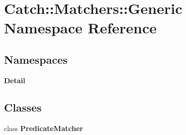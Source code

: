 \section{Catch\+::Matchers\+::Generic Namespace Reference}
\label{namespace_catch_1_1_matchers_1_1_generic}
\subsection*{Namespaces}
\begin{DoxyCompactItemize}
\item 
 \textbf{ Detail}
\end{DoxyCompactItemize}
\subsection*{Classes}
\begin{DoxyCompactItemize}
\item 
class \textbf{ Predicate\+Matcher}
\end{DoxyCompactItemize}

